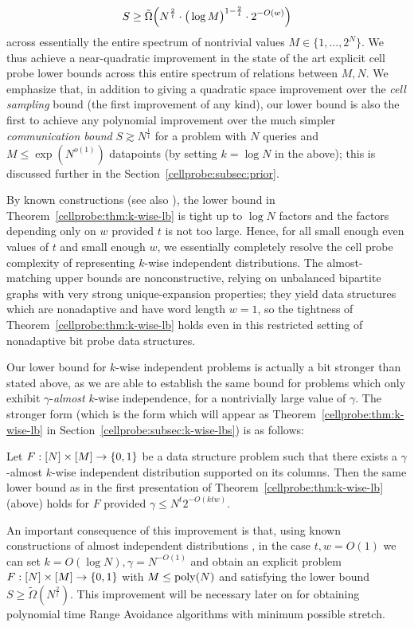 \[
S \geq \tilde{\Omega}\Bigl( N^{\frac{2}{t}} \cdot \big(\log M\big)^{1 - \frac{2}{t}} \cdot 2^{-O(w)}\Bigr)
\]
across essentially the entire spectrum of nontrivial values $M \in \{1,\ldots,2^N\}$. We thus achieve a near-quadratic improvement in the state of the art explicit cell probe lower bounds across this entire spectrum of relations between $M,N$. 
We emphasize that, in addition to giving a quadratic space improvement over the \emph{cell sampling} bound (the first improvement of any kind), our lower bound is also the first to achieve any polynomial improvement over the much simpler \emph{communication bound} $S \gtrsim N^{\frac{1}{t}}$ for a problem with $N$ queries and $M \leq \exp(N^{o(1)})$ datapoints (by setting $k=\log N$ in the above); this is discussed further in the Section~\ref{cellprobe:subsec:prior}. 

By known constructions \cite{Siegel89,Siegel04} (see also \cite{pudlak}), the lower bound in Theorem~\ref{cellprobe:thm:k-wise-lb} is tight up to $\log N$ factors and the factors depending only on $w$ provided $t$ is not too large. Hence, for all small enough even values of $t$ and small enough $w$, we essentially completely resolve the cell probe complexity of representing $k$-wise independent distributions. The almost-matching upper bounds are nonconstructive, relying on unbalanced bipartite graphs with very strong unique-expansion properties; they yield data structures which are nonadaptive and have word length $w=1$, so the tightness of Theorem~\ref{cellprobe:thm:k-wise-lb} holds even in this restricted setting of nonadaptive bit probe data structures.

Our lower bound for $k$-wise independent problems is actually a bit stronger than stated above, as we are able to establish the same bound for problems which only exhibit $\gamma$-\emph{almost} $k$-wise independence, for a nontrivially large value of $\gamma$. The stronger form (which is the form which will appear as Theorem~\ref{cellprobe:thm:k-wise-lb} in Section~\ref{cellprobe:subsec:k-wise-lbs}) is as follows:
\begin{theorem*}
Let $F: [N] \times [M] \to \{0,1\}$ be a data structure problem such that there exists a $\gamma$-almost $k$-wise independent distribution supported on its columns. 
Then the same lower bound as in the first presentation of Theorem~\ref{cellprobe:thm:k-wise-lb} (above) holds for $F$ provided $\gamma \leq  N^{t} 2^{-O(ktw)}$.
\end{theorem*}
An important consequence of this improvement is that, using known constructions of almost independent distributions \cite{naornaor}, in the case $t,w=O(1)$ we can set $k= O(\log N), \gamma = N^{-O(1)}$ and obtain an explicit problem $F: [N] \times [M] \to \{0,1\}$ with $M \leq \mathrm{poly}(N)$ and satisfying the lower bound $S \geq \tilde{\Omega}(N^{\frac{2}{t}})$.
This improvement will be necessary later on for obtaining polynomial time Range Avoidance algorithms with minimum possible stretch. 

